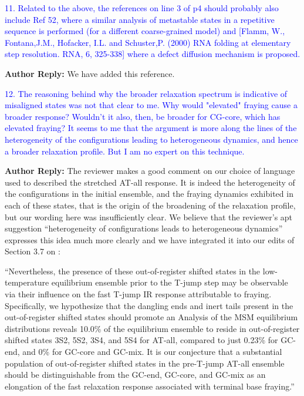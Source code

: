 \documentclass[11pt,a4paper]{letter} %
\newcommand*{\rood}[1]{{\color{red}{#1}}}
\begin{document}
\textcolor{blue}{11. Related to the above, the references on line 3 of p4 should probably also include Ref 52, where a similar analysis of metastable states in a repetitive sequence is performed (for a different coarse-grained model) and [Flamm, W., Fontana,J.M., Hofacker, I.L. and Schuster,P. (2000) RNA folding at elementary step resolution. RNA, 6, 325-338] where a defect diffusion mechanism is proposed.
}

\textbf{Author Reply:}   We have added this reference.





\textcolor{blue}{12. The reasoning behind why the broader relaxation spectrum is indicative of misaligned states was not that clear to me. Why would "elevated" fraying cause a broader response? Wouldn't it also, then, be broader for CG-core, which has elevated fraying? It seems to me that the argument is more along the lines of the heterogeneity of the configurations leading to heterogeneous dynamics, and hence a broader relaxation profile. But I am no expert on this technique.}

\textbf{Author Reply:}   The reviewer makes a good comment on our choice of language used to described the stretched AT-all response. It is indeed the heterogeneity of the configurations in the initial ensemble, and the fraying dynamics exhibited in each of these states, that is the origin of the broadening of the relaxation profile, but our wording here was insufficiently clear. We believe that the reviewer's apt suggestion ``heterogeneity of configurations leads to heterogeneous dynamics'' expresses this idea much more clearly and we have integrated it into our edits of Section 3.7 on \rood{p.~32}:

``Nevertheless, the presence of these out-of-register shifted states in the low-temperature equilibrium ensemble prior to the T-jump step may be observable via their influence on the fast T-jump IR response attributable to fraying. Specifically, we hypothesize that the dangling ends and inert tails present in the out-of-register shifted states should promote an \rood{elevated fraying response over the course of the relaxation that is distinct from that of in-register fraying. This heterogeneity of configurations should lead to heterogeneous dynamics, manifested in the observation of a more stretched relaxation over experimental time scales of 70-100 ns.} Analysis of the MSM equilibrium distributions reveals 10.0\% of the equilibrium ensemble to reside in out-of-register shifted states 3S2, 5S2, 3S4, and 5S4 for AT-all, compared to just 0.23\% for GC-end, and 0\% for GC-core and GC-mix. It is our conjecture that a substantial population of out-of-register shifted states in the pre-T-jump AT-all ensemble should be distinguishable from the GC-end, GC-core, and GC-mix as an elongation of the fast relaxation response associated with terminal base fraying.''
\end{document}
